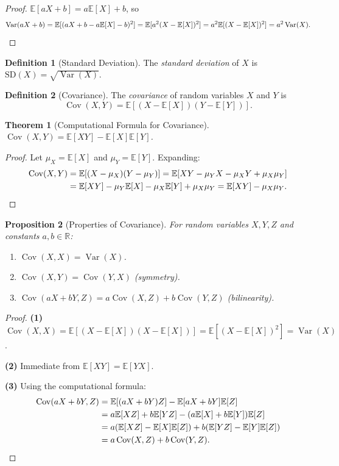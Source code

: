 \documentclass[11pt,a4paper]{article}
\theoremstyle{definition}
\newtheorem{definition}{Definition}[section]
\theoremstyle{plain}
\newtheorem{theorem}{Theorem}[section]
\newtheorem{proposition}[theorem]{Proposition}
\theoremstyle{remark}
\newcommand{\R}{\mathbb{R}}
\newcommand{\E}{\mathbb{E}}
\DeclareMathOperator{\Var}{Var}
\DeclareMathOperator{\Cov}{Cov}
\begin{document}
\begin{proof}
$\E[aX + b] = a\E[X] + b$, so
\[
    \Var(aX + b) = \E[(aX + b - a\E[X] - b)^2] = \E[a^2(X - \E[X])^2]
    = a^2\E[(X - \E[X])^2] = a^2\Var(X).
    \qedhere
\]
\end{proof}

\begin{definition}[Standard Deviation]
\label{def:std_dev}
The \emph{standard deviation} of $X$ is $\mathrm{SD}(X) = \sqrt{\Var(X)}$.
\end{definition}

\begin{definition}[Covariance]
\label{def:covariance}
The \emph{covariance} of random variables $X$ and $Y$ is
\[
    \Cov(X, Y) = \E\!\left[(X - \E[X])(Y - \E[Y])\right].
\]
\end{definition}

\begin{theorem}[Computational Formula for Covariance]
\label{thm:cov_formula}
$\Cov(X, Y) = \E[XY] - \E[X]\E[Y]$.
\end{theorem}

\begin{proof}
Let $\mu_X = \E[X]$ and $\mu_Y = \E[Y]$. Expanding:
\begin{align*}
    \Cov(X,Y) &= \E[(X - \mu_X)(Y - \mu_Y)] = \E[XY - \mu_Y X - \mu_X Y + \mu_X\mu_Y] \\
    &= \E[XY] - \mu_Y\E[X] - \mu_X\E[Y] + \mu_X\mu_Y = \E[XY] - \mu_X\mu_Y.
    \qedhere
\end{align*}
\end{proof}

\begin{proposition}[Properties of Covariance]
\label{prop:cov_properties}
For random variables $X, Y, Z$ and constants $a, b \in \R$:
\begin{enumerate}[nosep]
    \item $\Cov(X, X) = \Var(X)$.
    \item $\Cov(X, Y) = \Cov(Y, X)$ \hfill(symmetry).
    \item $\Cov(aX + bY, Z) = a\Cov(X, Z) + b\Cov(Y, Z)$ \hfill(bilinearity).
\end{enumerate}
\end{proposition}

\begin{proof}
\textbf{(1)} $\Cov(X,X) = \E[(X - \E[X])(X - \E[X])] = \E[(X - \E[X])^2] = \Var(X)$.

\textbf{(2)} Immediate from $\E[XY] = \E[YX]$.

\textbf{(3)} Using the computational formula:
\begin{align*}
    \Cov(aX + bY, Z) &= \E[(aX + bY)Z] - \E[aX + bY]\E[Z] \\
    &= a\E[XZ] + b\E[YZ] - (a\E[X] + b\E[Y])\E[Z] \\
    &= a(\E[XZ] - \E[X]\E[Z]) + b(\E[YZ] - \E[Y]\E[Z]) \\
    &= a\Cov(X,Z) + b\Cov(Y,Z).
    \qedhere
\end{align*}
\end{proof}
\end{document}
